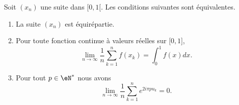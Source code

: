 \begin{proposition}  \label{PropDMvPDc}
    Soit \( (x_n)\) une suite dans \( \mathopen[ 0 , 1 [\). Les conditions suivantes sont équivalentes.
    \begin{enumerate}
        \item   \label{ItemKWcZTHqi}
            La suite \( (x_n)\) est équirépartie.
        \item\label{ItemKWcZTHqii}
            Pour toute fonction continue à valeurs réelles sur \( \mathopen[ 0 , 1 \mathclose]\),
            \begin{equation}    \label{EqBSqdjpn}
                \lim_{n\to \infty} \frac{1}{ n }\sum_{k=1}^nf(x_k)=\int_0^1f(x)dx.
            \end{equation}
        \item\label{ItemKWcZTHqiii}
            Pour tout \( p\in\eN^*\) nous avons
            \begin{equation}
                \lim_{n\to \infty} \frac{1}{ n }\sum_{k=1}^n e^{2i\pi pu_k}=0.
            \end{equation}
    \end{enumerate}
\end{proposition}


